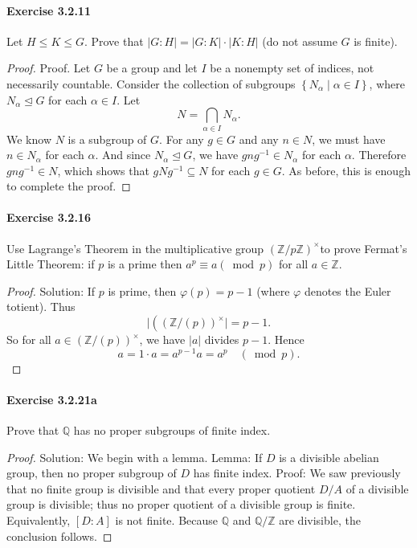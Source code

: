\documentclass{article}
\theoremstyle{definition}
\begin{document}
\paragraph{Exercise 3.2.11} Let $H \leq K \leq G$. Prove that $|G: H|=|G: K| \cdot|K: H|$ (do not assume $G$ is finite).
\begin{proof}
    Proof. Let $G$ be a group and let $I$ be a nonempty set of indices, not necessarily countable. Consider the collection of subgroups $\left\{N_\alpha \mid \alpha \in I\right\}$, where $N_\alpha \unlhd G$ for each $\alpha \in I$. Let
$$
N=\bigcap_{\alpha \in I} N_\alpha .
$$
We know $N$ is a subgroup of $G$. 
For any $g \in G$ and any $n \in N$, we must have $n \in N_\alpha$ for each $\alpha$. And since $N_\alpha \unlhd G$, we have $g n g^{-1} \in N_\alpha$ for each $\alpha$. Therefore $g n g^{-1} \in N$, which shows that $g N g^{-1} \subseteq N$ for each $g \in G$. As before, this is enough to complete the proof.
\end{proof}



\paragraph{Exercise 3.2.16} Use Lagrange's Theorem in the multiplicative group $(\mathbb{Z} / p \mathbb{Z})^{\times}$to prove Fermat's Little Theorem: if $p$ is a prime then $a^{p} \equiv a(\bmod p)$ for all $a \in \mathbb{Z}$.
\begin{proof}
    Solution: If $p$ is prime, then $\varphi(p)=p-1$ (where $\varphi$ denotes the Euler totient). Thus
$$
\mid\left((\mathbb{Z} /(p))^{\times} \mid=p-1 .\right.
$$
So for all $a \in(\mathbb{Z} /(p))^{\times}$, we have $|a|$ divides $p-1$. Hence
$$
a=1 \cdot a=a^{p-1} a=a^p \quad(\bmod p) .
$$
\end{proof}



\paragraph{Exercise 3.2.21a} Prove that $\mathbb{Q}$ has no proper subgroups of finite index.
\begin{proof}
    Solution: We begin with a lemma.
Lemma: If $D$ is a divisible abelian group, then no proper subgroup of $D$ has finite index.
Proof: We saw previously that no finite group is divisible and that every proper quotient $D / A$ of a divisible group is divisible; thus no proper quotient of a divisible group is finite. Equivalently, $[D: A]$ is not finite.
Because $\mathbb{Q}$ and $\mathbb{Q} / \mathbb{Z}$ are divisible, the conclusion follows.
\end{proof}
\end{document}
